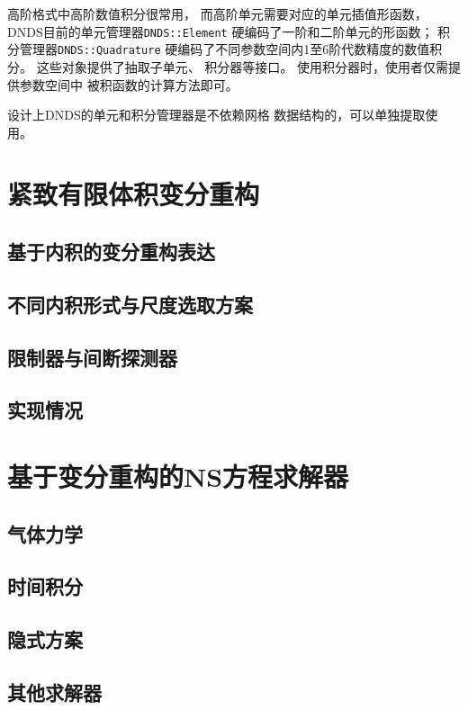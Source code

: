 \documentclass[UTF8,zihao=5]{ctexart} %
\begin{document}
高阶格式中高阶数值积分很常用，
而高阶单元需要对应的单元插值形函数，
DNDS目前的单元管理器\verb|DNDS::Element|
硬编码了一阶和二阶单元的形函数；
积分管理器\verb|DNDS::Quadrature|
硬编码了不同参数空间内1至6阶代数精度的数值积分。
这些对象提供了抽取子单元、
积分器等接口。
使用积分器时，使用者仅需提供参数空间中
被积函数的计算方法即可。

设计上DNDS的单元和积分管理器是不依赖网格
数据结构的，可以单独提取使用。


\section{紧致有限体积变分重构}

\subsection{基于内积的变分重构表达}

\subsection{不同内积形式与尺度选取方案}

\subsection{限制器与间断探测器}

\subsection{实现情况}

\section{基于变分重构的NS方程求解器}

\subsection{气体力学}

\subsection{时间积分}

\subsection{隐式方案}

\subsection{其他求解器}
\end{document}
